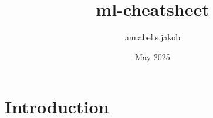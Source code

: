 \documentclass{article}
\title{ml-cheatsheet}
\author{annabel.s.jakob }
\date{May 2025}
\begin{document}
\maketitle

\section{Introduction}
\end{document}
